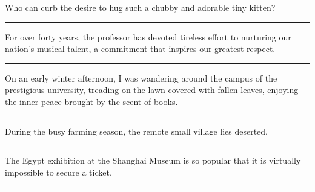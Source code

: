\documentclass[11pt,a4paper]{article}
\newcommand{\num}[1]{\makebox[1.9em][r]{#1.}\hspace{0.3em}}
\newcommand{\wline}{\noindent\rule{\linewidth}{0.4pt}}
\begin{document}
\begin{minipage}{\linewidth}

\num{24}Who can curb the desire to hug such a chubby and adorable tiny kitten?

\vspace{0.25em}

\wline

\end{minipage}

\begin{minipage}{\linewidth}

\num{25}For over forty years, the professor has devoted tireless effort to nurturing our nation’s musical talent, a commitment that inspires our greatest respect.

\vspace{0.25em}

\wline

\end{minipage}

\begin{minipage}{\linewidth}

\num{26}On an early winter afternoon, I was wandering around the campus of the prestigious university, treading on the lawn covered with fallen leaves, enjoying the inner peace brought by the scent of books.

\vspace{0.25em}

\wline

\end{minipage}

\vspace{0.35em}\vspace{0.15em}

\begin{minipage}{\linewidth}

\num{27}During the busy farming season, the remote small village lies deserted.

\vspace{0.25em}

\wline

\end{minipage}

\begin{minipage}{\linewidth}

\num{28}The Egypt exhibition at the Shanghai Museum is so popular that it is virtually impossible to secure a ticket.

\vspace{0.25em}

\wline

\end{minipage}
\end{document}
